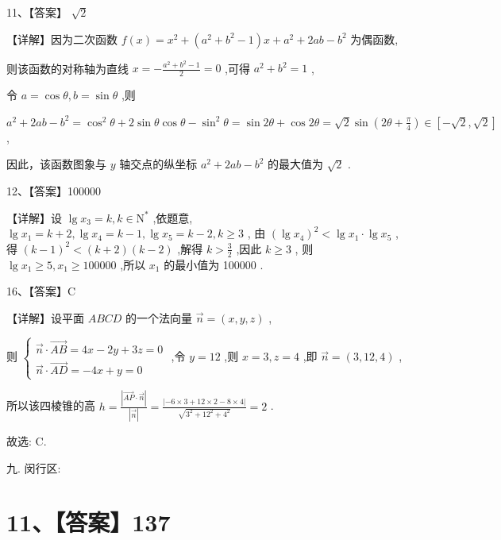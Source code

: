 \documentclass[10pt]{article}
\begin{document}
11、【答案】 \(\sqrt{2}\)

【详解】因为二次函数 \(f\left( x\right)  = {x}^{2} + \left( {{a}^{2} + {b}^{2} - 1}\right) x + {a}^{2} + {2ab} - {b}^{2}\) 为偶函数,

则该函数的对称轴为直线 \(x =  - \frac{{a}^{2} + {b}^{2} - 1}{2} = 0\) ,可得 \({a}^{2} + {b}^{2} = 1\) ,

令 \(a = \cos \theta ,b = \sin \theta\) ,则

\({a}^{2} + {2ab} - {b}^{2} = {\cos }^{2}\theta  + 2\sin \theta \cos \theta  - {\sin }^{2}\theta  = \sin {2\theta } + \cos {2\theta } = \sqrt{2}\sin \left( {{2\theta } + \frac{\pi }{4}}\right)  \in  \left\lbrack  {-\sqrt{2},\sqrt{2}}\right\rbrack\) ,

因此，该函数图象与 \(y\) 轴交点的纵坐标 \({a}^{2} + {2ab} - {b}^{2}\) 的最大值为 \(\sqrt{2}\) .

12、【答案】100000

【详解】设 \(\lg {x}_{3} = k,k \in  {\mathrm{N}}^{ * }\) ,依题意, \(\lg {x}_{1} = k + 2,\lg {x}_{4} = k - 1,\lg {x}_{5} = k - 2,k \geq  3\) , 由 \({\left( \lg {x}_{4}\right) }^{2} < \lg {x}_{1} \cdot  \lg {x}_{5}\) ,得 \({\left( k - 1\right) }^{2} < \left( {k + 2}\right) \left( {k - 2}\right)\) ,解得 \(k > \frac{3}{2}\) ,因此 \(k \geq  3\) , 则 \(\lg {x}_{1} \geq  5,{x}_{1} \geq  {100000}\) ,所以 \({x}_{1}\) 的最小值为 100000 .

16、【答案】C

【详解】设平面 \({ABCD}\) 的一个法向量 \(\overrightarrow{n} = \left( {x,y,z}\right)\) ,

则 \(\left\{  \begin{array}{l} \overrightarrow{n} \cdot  \overrightarrow{AB} = {4x} - {2y} + {3z} = 0 \\  \overrightarrow{n} \cdot  \overrightarrow{AD} =  - {4x} + y = 0 \end{array}\right.\) ,令 \(y = {12}\) ,则 \(x = 3,z = 4\) ,即 \(\overrightarrow{n} = \left( {3,{12},4}\right)\) ,

所以该四棱锥的高 \(h = \frac{\left| \overrightarrow{AP} \cdot  \overrightarrow{n}\right| }{\left| \overrightarrow{n}\right| } = \frac{\left| -6 \times  3 + {12} \times  2 - 8 \times  4\right| }{\sqrt{{3}^{2} + {12}^{2} + {4}^{2}}} = 2\) .

故选: C.

九. 闵行区:

\section*{11、【答案】137}
\end{document}
